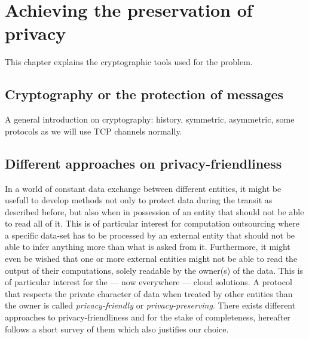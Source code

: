 \chapter{Achieving the preservation of privacy}
\label{cha:3}
This chapter explains the cryptographic tools used for the problem.

\section{Cryptography or the protection of messages}
A general introduction on cryptography: history, symmetric, asymmetric, some protocols as we will use TCP channels normally.

\section{Different approaches on privacy-friendliness}
In a world of constant data exchange between different entities, it might be usefull to develop methods not only to protect data during the transit as described before, but also when in possession of an entity that should not be able to read all of it. This is of particular interest for computation outsourcing where a specific data-set has to be processed by an external entity that should not be able to infer anything more than what is asked from it. Furthermore, it might even be wished that one or more external entities might not be able to read the output of their computations, solely readable by the owner(s) of the data. This is of particular interest for the --- now everywhere --- cloud solutions. A protocol that respects the private character of data when treated by other entities than the owner is called \emph{privacy-friendly} or \emph{privacy-preserving}. There exists different approaches to privacy-friendliness and for the stake of completeness, hereafter follows a short survey of them which also justifies our choice.

